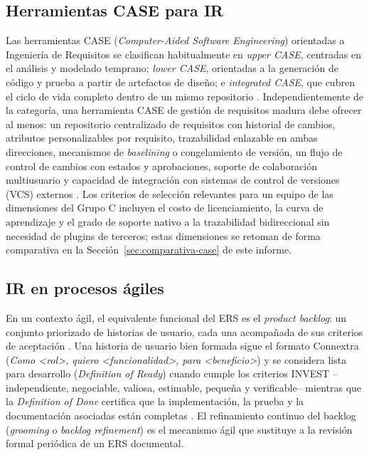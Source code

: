 \documentclass[11pt,a4paper]{article}
\begin{document}
\subsection{Herramientas CASE para IR}
Las herramientas CASE (\textit{Computer-Aided Software Engineering}) orientadas a Ingeniería de Requisitos se clasifican habitualmente en \textit{upper CASE}, centradas en el análisis y modelado temprano; \textit{lower CASE}, orientadas a la generación de código y prueba a partir de artefactos de diseño; e \textit{integrated CASE}, que cubren el ciclo de vida completo dentro de un mismo repositorio \cite{swebok2024,pohl2010}. Independientemente de la categoría, una herramienta CASE de gestión de requisitos madura debe ofrecer al menos: un repositorio centralizado de requisitos con historial de cambios, atributos personalizables por requisito, trazabilidad enlazable en ambas direcciones, mecanismos de \textit{baselining} o congelamiento de versión, un flujo de control de cambios con estados y aprobaciones, soporte de colaboración multiusuario y capacidad de integración con sistemas de control de versiones (VCS) externos \cite{wiegers2013softwarerequirements,clelandhuang2012traceability}. Los criterios de selección relevantes para un equipo de las dimensiones del Grupo C incluyen el costo de licenciamiento, la curva de aprendizaje y el grado de soporte nativo a la trazabilidad bidireccional sin necesidad de plugins de terceros; estas dimensiones se retoman de forma comparativa en la Sección~\ref{sec:comparativa-case} de este informe.

\subsection{IR en procesos ágiles}
En un contexto ágil, el equivalente funcional del ERS es el \textit{product backlog}: un conjunto priorizado de historias de usuario, cada una acompañada de sus criterios de aceptación \cite{cohn2004userstories}. Una historia de usuario bien formada sigue el formato Connextra (\textit{Como <rol>, quiero <funcionalidad>, para <beneficio>}) y se considera lista para desarrollo (\textit{Definition of Ready}) cuando cumple los criterios INVEST --independiente, negociable, valiosa, estimable, pequeña y verificable-- mientras que la \textit{Definition of Done} certifica que la implementación, la prueba y la documentación asociadas están completas \cite{cohn2004userstories}. El refinamiento continuo del backlog (\textit{grooming} o \textit{backlog refinement}) es el mecanismo ágil que sustituye a la revisión formal periódica de un ERS documental.
\end{document}
